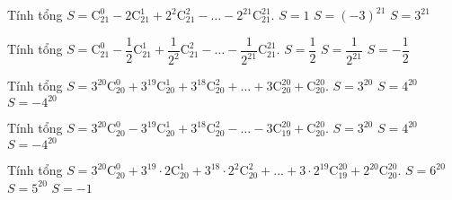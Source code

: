 \begin{ex}%
Tính tổng $S = \mathrm{C}_{21}^0-2\mathrm{C}_{21}^1+2^2\mathrm{C}_{21}^2-\ldots -2^{21}\mathrm{C}_{21}^{21}.$
{$S=1 $}
{$S = (-3)^{21} $}
{$S = 3^{21} $}
\loigiai{
\[ -1=(1-2)^{21}=\mathrm{C}_{21}^0-2\mathrm{C}_{21}^1+2^2\mathrm{C}_{21}^2-\ldots -2^{21}\mathrm{C}_{21}^{21}. \]
}
\end{ex}
\begin{ex}%
Tính tổng $S = \mathrm{C}_{21}^0-\dfrac{1}{2}\mathrm{C}_{21}^1+\dfrac{1}{2^2}\mathrm{C}_{21}^2-\ldots -\dfrac{1}{2^{21}}\mathrm{C}_{21}^{21}.$
{$S = \dfrac{1}{2} $}
{\True $S = \dfrac{1}{2^{21}} $}
{$S = -\dfrac{1}{2} $}
\loigiai{
\[ \left(\dfrac{1}{2}\right)^{21}=\left (1-\dfrac{1}{2}\right )^{21}=\mathrm{C}_{21}^0-\dfrac{1}{2}\mathrm{C}_{21}^1+\dfrac{1}{2^2}\mathrm{C}_{21}^2-\ldots -\dfrac{1}{2^{21}}\mathrm{C}_{21}^{21}. \]
}
\end{ex}


\begin{ex}%
Tính tổng $S = 3^{20}\mathrm{C}_{20}^0+3^{19}\mathrm{C}_{20}^1+3^{18}\mathrm{C}_{20}^2+\ldots +3\mathrm{C}_{20}^{20}+\mathrm{C}_{20}^{20}.$
{$ S=3^{20}$}
{\True $S =4^{20} $}
{$S=-4^{20} $}
\loigiai{
\[ 4^{20}=(1+3)^{20}=3^{20}\mathrm{C}_{20}^0+3^{19}\mathrm{C}_{20}^1+3^{18}\mathrm{C}_{20}^2+\ldots +3\mathrm{C}_{20}^{20}+\mathrm{C}_{20}^{20}. \]
}
\end{ex}

\begin{ex}%
Tính tổng $S = 3^{20}\mathrm{C}_{20}^0-3^{19}\mathrm{C}_{20}^1+3^{18}\mathrm{C}_{20}^2-\ldots -3\mathrm{C}_{19}^{20}+\mathrm{C}_{20}^{20}.$
{$ S=3^{20}$}
{$S =4^{20} $}
{$S=-4^{20} $}
\loigiai{
\[ 2^{20}=(3-1)^{20}=3^{20}\mathrm{C}_{20}^0-3^{19}\mathrm{C}_{20}^1+3^{18}\mathrm{C}_{20}^2-\ldots -3\mathrm{C}_{19}^{20}+\mathrm{C}_{20}^{20}. \]
}
\end{ex}
\begin{ex}%
Tính tổng $S = 3^{20}\mathrm{C}_{20}^0+3^{19}\cdot 2\mathrm{C}_{20}^1+3^{18}\cdot 2^2\mathrm{C}_{20}^2+\ldots +3\cdot 2^{19}\mathrm{C}_{19}^{20}+2^{20}\mathrm{C}_{20}^{20}.$
{$S= 6^{20}$}
{\True $S = 5^{20} $}
{$S=-1 $}
\loigiai{
\[ 5^{20}=(3+2)^{20}=3^{20}\mathrm{C}_{20}^0+3^{19}\cdot 2\mathrm{C}_{20}^1+3^{18}\cdot 2^2\mathrm{C}_{20}^2+\ldots +3\cdot 2^{19}\mathrm{C}_{19}^{20}+2^{20}\mathrm{C}_{20}^{20}. \]
}
\end{ex}

